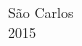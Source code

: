 \documentclass[a4paper,openright,12pt]{report} %
\begin{document}
\addvspace{3.0cm}

\begin{center}
\vspace{1.5cm}
\Large{S\~ao Carlos}\\
\Large{2015}
\end{center}


%
%
%
%




%
%
%
%
%
%
%
%
%



%
%
%
%
%
%
%
%
\end{document}
